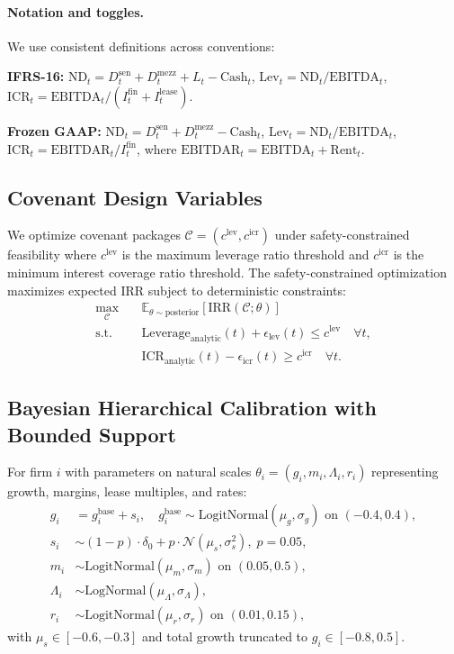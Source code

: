 \documentclass[11pt,a4paper]{article}
\newcommand{\E}{\mathbb{E}}
\newcommand{\ND}{\mathrm{ND}} %
\newcommand{\EBITDA}{\mathrm{EBITDA}}
\newcommand{\EBITDAR}{\mathrm{EBITDAR}}
\newcommand{\ICR}{\mathrm{ICR}}
\newcommand{\Lev}{\mathrm{Lev}}
\newcommand{\Ifin}{I^{\mathrm{fin}}}
\newcommand{\Ilease}{I^{\mathrm{lease}}}
\newcommand{\Llease}{L} %
\theoremstyle{plain}
\theoremstyle{definition}
\begin{document}
\paragraph{Notation and toggles.}
We use consistent definitions across conventions:

\textbf{IFRS-16:} $\ND_t = D^{\mathrm{sen}}_t + D^{\mathrm{mezz}}_t + \Llease_t - \mathrm{Cash}_t$,
$\Lev_t=\ND_t/\EBITDA_t$, $\ICR_t = \EBITDA_t/(\Ifin_t+\Ilease_t)$.

\textbf{Frozen GAAP:} $\ND_t = D^{\mathrm{sen}}_t + D^{\mathrm{mezz}}_t - \mathrm{Cash}_t$,
$\Lev_t=\ND_t/\EBITDA_t$, $\ICR_t = \EBITDAR_t/\Ifin_t$, where $\EBITDAR_t=\EBITDA_t+\mathrm{Rent}_t$.

\subsection{Covenant Design Variables}

We optimize covenant packages $\mathcal{C} = (c^{\text{lev}}, c^{\text{icr}})$ under safety-constrained feasibility where $c^{\text{lev}}$ is the maximum leverage ratio threshold and $c^{\text{icr}}$ is the minimum interest coverage ratio threshold. The safety-constrained optimization maximizes expected IRR subject to deterministic constraints:
\begin{align}
\max_{\mathcal{C}} \quad &\E_{\theta \sim \text{posterior}}\!\left[\text{IRR}(\mathcal{C};\theta)\right] \\
\text{s.t.} \quad &\text{Leverage}_{\text{analytic}}(t) + \epsilon_{\text{lev}}(t) \leq c^{\text{lev}} \quad \forall t, \\
&\text{ICR}_{\text{analytic}}(t) - \epsilon_{\text{icr}}(t) \geq c^{\text{icr}} \quad \forall t.
\end{align}

\subsection{Bayesian Hierarchical Calibration with Bounded Support}

For firm $i$ with parameters on natural scales $\theta_i = (g_i, m_i, \Lambda_i, r_i)$ representing growth, margins, lease multiples, and rates:
\begin{align}
g_i &= g^{\text{base}}_i + s_i, \quad g^{\text{base}}_i \sim \text{LogitNormal}(\mu_g,\sigma_g) \text{ on } (-0.4,0.4), \\
s_i &\sim (1-p)\cdot \delta_0 + p\cdot \mathcal{N}(\mu_s,\sigma_s^2),\; p=0.05, \\
m_i &\sim \text{LogitNormal}(\mu_m,\sigma_m) \text{ on } (0.05,0.5), \\
\Lambda_i &\sim \text{LogNormal}(\mu_\Lambda,\sigma_\Lambda), \\
r_i &\sim \text{LogitNormal}(\mu_r,\sigma_r) \text{ on } (0.01,0.15),
\end{align}
with $\mu_s\in[-0.6,-0.3]$ and total growth truncated to $g_i\in[-0.8,0.5]$.
\end{document}

